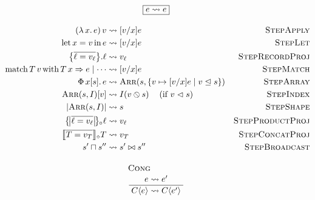 \begin{align*}
\multispan{3}{\hfil$\displaystyle \boxed{e \step e}$\hfil} \\[1em]
% 
% 
(\slam{x}{e})\,v 
&\leadsto \subst{v}{x}{e} 
& \textsc{StepApply} \\ 
% 
\slet{x}{v}{e} 
&\leadsto \subst{v}{x}{e}
& \textsc{StepLet} \\ 
% 
\sproj{\srecordval{\overline{\ell = v_\ell}}}{\ell} &\leadsto v_\ell 
& \textsc{StepRecordProj} \\
% 
\smatch{\stag{T}{v}}{T\,x\Rightarrow e \mid \cdots} 
&\leadsto \subst{v}{x}{e}
& \textsc{StepMatch} \\
% 
\sbuild{x}{\vess}{e} 
&\leadsto \sarrayval{\vess}{\{ v \mapsto \subst{v}{x}{e} \mid v \inbsp \vess \}} 
& \textsc{StepArray} \\
% 
\sindex{\sarrayval{\vess}{I}}{v} 
&\leadsto I(\scast{v}{s})\;\;\
\text{ (if $v \inbs \vess$)}
& \textsc{StepIndex} \\
% 
\sshape{\sarrayval{\vess}{I}} 
&\leadsto \vess 
& \textsc{StepShape} \\
% 
\sproductproj{\sproductval{\overline{\ell= v_\ell}}}{\ell} 
&\leadsto v_\ell
& \textsc{StepProductProj} \\
% 
\sconcatproj{\sconcatval{\overline{T = v_T}}}{T} 
&\leadsto v_T 
& \textsc{StepConcatProj} \\
% 
\vess' \broadcast \vess'' 
&\leadsto \vess' \broadcastsem \vess'' 
& \textsc{StepBroadcast} 
\\[0.5em]
% 
% 
\multispan{3}{\hfil$\displaystyle \irule{Cong}{e \leadsto e'}{\evalct{C}{e} \leadsto \evalct{C}{e'}}$\hfil}
\end{align*} 
